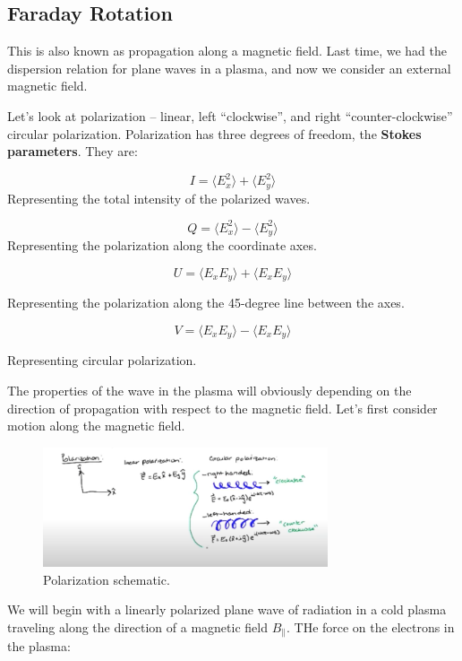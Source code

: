\documentclass{article}
\begin{document}
\subsection{Faraday Rotation}

This is also known as propagation along a magnetic field. Last time, we had the dispersion relation for plane waves in a plasma, and now we consider an external magnetic field. 

Let's look at polarization -- linear, left ``clockwise'', and right ``counter-clockwise'' circular polarization. Polarization has three degrees of freedom, the \textbf{Stokes parameters}. They are:

$$
I = \langle E_x^2 \rangle + \langle E_y^2 \rangle 
$$
Representing the total intensity of the polarized waves.

$$
Q = \langle E_x^2 \rangle - \langle E_y^2 \rangle 
$$
Representing the polarization along the coordinate axes. 

$$
U = \langle E_x E_y \rangle + \langle E_x E_y \rangle
$$

Representing the polarization along the 45-degree line between the axes.

$$
V = \langle E_x E_y \rangle - \langle E_x E_y \rangle
$$

Representing circular polarization.

The properties of the wave in the plasma will obviously depending on the direction of propagation with respect to the magnetic field. Let's first consider motion along the magnetic field. 

\begin{figure}
    \centering
    \includegraphics[width=0.75\textwidth]{figures/Screen Shot 2020-10-22 at 7.42.12 PM.png}
    \caption{Polarization schematic.}
    \label{fig:polariz}
\end{figure}

We will begin with a linearly polarized plane wave of radiation in a cold plasma traveling along the direction of a magnetic field $B_\parallel$. THe force on the electrons in the plasma:
\end{document}
